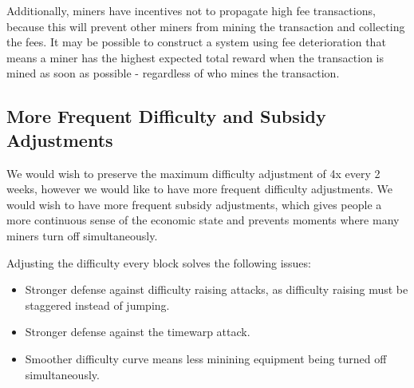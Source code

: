 \documentclass[twocolumn]{article}
\begin{document}
Additionally, miners have incentives not to propagate high fee transactions, because this will prevent other miners from mining the transaction and collecting the fees.
It may be possible to construct a system using fee deterioration that means a miner has the highest expected total reward when the transaction is mined as soon as possible - regardless of who mines the transaction.

\subsection{More Frequent Difficulty and Subsidy Adjustments}
We would wish to preserve the maximum difficulty adjustment of 4x every 2 weeks, however we would like to have more frequent difficulty adjustments.
We would wish to have more frequent subsidy adjustments, which gives people a more continuous sense of the economic state and prevents moments where many miners turn off simultaneously.

Adjusting the difficulty every block solves the following issues:
\begin{itemize}
	\item Stronger defense against difficulty raising attacks, as difficulty raising must be staggered instead of jumping.
	\item Stronger defense against the timewarp attack.
	\item Smoother difficulty curve means less minining equipment being turned off simultaneously.
\end{itemize}


\end{document}
